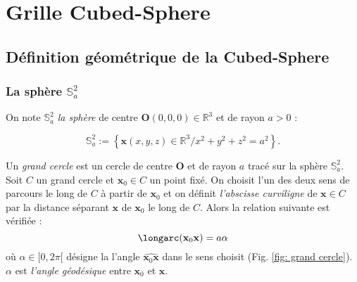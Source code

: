 \chapter{Grille Cubed-Sphere}
\label{chap:3}

\section{Définition géométrique de la Cubed-Sphere}

\subsection{La sphère $\mathbb{S}_a^2$}

On note $\mathbb{S}_a^2$ \textit{la sphère} de centre $\mathbf{O} (0,0,0) \in \mathbb{R}^3$ et de rayon $a>0$ :

\begin{equation}
\mathbb{S}_a^2 := \left\lbrace
\mathbf{x} (x,y,z) \in \mathbb{R}^3 / x^2+y^2+z^2 = a^2
\right\rbrace.
\end{equation} 

Un \textit{grand cercle} est un cercle de centre $\mathbf{O}$ et de rayon $a$ tracé sur la sphère $\mathbb{S}_a^2$.
Soit $C$ un grand cercle et $\mathbf{x}_0 \in C$ un point fixé. On choisit l'un des deux sens de parcours le long de $C$ à partir de $\mathbf{x}_0$ et on définit \textit{l'abscisse curviligne} de $\mathbf{x} \in C$ par la distance séparant $\mathbf{x}$ de $\mathbf{x}_0$ le long de $C$. Alors la relation suivante est vérifiée :
\begin{equation}
\longarc(\mathbf{x}_0  \mathbf{x}) = a \alpha
\end{equation}
où $\alpha \in [ 0, 2 \pi[$ désigne la l'angle $\widehat{\mathbf{x}_0  \mathbf{x}}$ dans le sens choisit (Fig. \ref{fig: grand cercle}). $\alpha$ est \textit{l'angle géodésique} entre $\mathbf{x}_0$ et $\mathbf{x}$.

